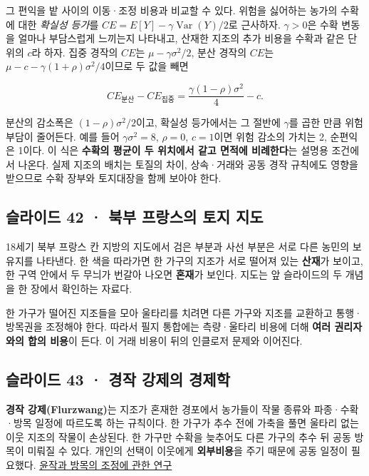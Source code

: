 \documentclass[10pt,a4paper]{article}
\begin{document}
그 편익을 밭 사이의 이동·조정 비용과 비교할 수 있다. 위험을 싫어하는 농가의 수확에 대한 \emph{확실성 등가}를 $CE=E[Y]-\gamma\operatorname{Var}(Y)/2$로 근사하자. $\gamma>0$은 수확 변동을 얼마나 부담스럽게 느끼는지 나타내고, 산재한 지조의 추가 비용을 수확과 같은 단위의 $c$라 하자. 집중 경작의 $CE$는 $\mu-\gamma\sigma^2/2$, 분산 경작의 $CE$는 $\mu-c-\gamma(1+\rho)\sigma^2/4$이므로 두 값을 빼면\par

\[
CE_{\mbox{분산}}-CE_{\mbox{집중}}
=\frac{\gamma(1-\rho)\sigma^2}{4}-c.
\]

분산의 감소폭은 $(1-\rho)\sigma^2/2$이고, 확실성 등가에서는 그 절반에 $\gamma$를 곱한 만큼 위험 부담이 줄어든다. 예를 들어 $\gamma\sigma^2=8$, $\rho=0$, $c=1$이면 위험 감소의 가치는 2, 순편익은 1이다. 이 식은 \textbf{수확의 평균이 두 위치에서 같고 면적에 비례한다}는 설명용 조건에서 나온다. 실제 지조의 배치는 토질의 차이, 상속·거래와 공동 경작 규칙에도 영향을 받으므로 수확 장부와 토지대장을 함께 보아야 한다.\par

\subsection{슬라이드 42 · 북부 프랑스의 토지 지도}
18세기 북부 프랑스 칸 지방의 지도에서 검은 부분과 사선 부분은 서로 다른 농민의 보유지를 나타낸다. 한 색을 따라가면 한 가구의 지조가 서로 떨어져 있는 \textbf{산재}가 보이고, 한 구역 안에서 두 무늬가 번갈아 나오면 \textbf{혼재}가 보인다. 지도는 앞 슬라이드의 두 개념을 한 장에서 확인하는 자료다.\par

한 가구가 떨어진 지조들을 모아 울타리를 치려면 다른 가구와 지조를 교환하고 통행·방목권을 조정해야 한다. 따라서 필지 통합에는 측량·울타리 비용에 더해 \textbf{여러 권리자와의 합의 비용}이 든다. 이 거래 비용이 뒤의 인클로저 문제와 이어진다.\par

\subsection{슬라이드 43 · 경작 강제의 경제학}
\textbf{경작 강제(Flurzwang)}는 지조가 혼재한 경포에서 농가들이 작물 종류와 파종·수확·방목 일정에 따르도록 하는 규칙이다. 한 가구가 추수 전에 가축을 풀면 울타리 없는 이웃 지조의 작물이 손상된다. 한 가구만 수확을 늦추어도 다른 가구의 추수 뒤 공동 방목이 미뤄질 수 있다. 개인의 선택이 이웃에게 \textbf{외부비용}을 주기 때문에 공동 일정이 필요했다. \href{https://academic.oup.com/book/61548/chapter/537298429}{윤작과 방목의 조정에 관한 연구}\par
\end{document}

